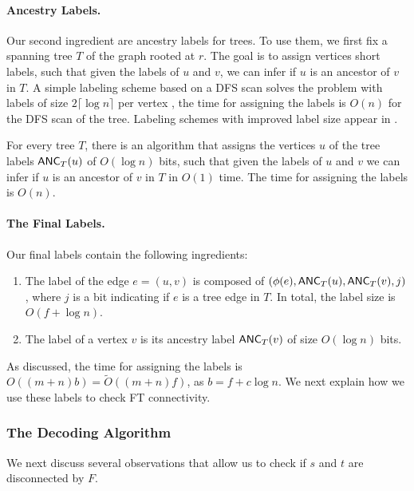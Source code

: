 \paragraph{Ancestry Labels.} Our second ingredient are ancestry labels for trees.
To use them, we first fix a spanning tree $T$ of the graph rooted at $r$. The goal is to assign vertices short labels, such that given the labels of $u$ and $v$, we can infer if $u$ is an ancestor of $v$ in $T$. A simple labeling scheme based on a DFS scan solves the problem with labels of size $2 \lceil \log{n} \rceil$ per vertex \cite{kannan1992implicat}, the time for assigning the labels is $O(n)$ for the DFS scan of the tree. Labeling schemes with improved label size appear in \cite{abiteboul2006compact,alstrup2002improved,fraigniaud2010compact,fraigniaud2010optimal}.

\begin{lemma} \label{anc_labels}
For every tree $T$, there is an algorithm that assigns the vertices $u$ of the tree labels $\mathsf{ANC}_T(u)$ of $O(\log{n})$ bits, such that given the labels of $u$ and $v$ we can infer if $u$ is an ancestor of $v$ in $T$ in $O(1)$ time. The time for assigning the labels is $O(n)$. 
\end{lemma}

\paragraph{The Final Labels.}
Our final labels contain the following ingredients:
\begin{enumerate}
\item The label of the edge $e=(u,v)$ is composed of $(\phi(e),\mathsf{ANC}_T(u),\mathsf{ANC}_T(v),j)$, where $j$ is a bit indicating if $e$ is a tree edge in $T$. In total, the label size is $O(f + \log{n})$.
\item The label of a vertex $v$ is its ancestry label $\mathsf{ANC}_T(v)$ of size $O(\log{n})$ bits.
\end{enumerate}

As discussed, the time for assigning the labels is $O((m+n)b)=\widetilde{O}((m+n)f)$, as $b=f+c\log{n}$.
We next explain how we use these labels to check FT connectivity.


\subsubsection{The Decoding Algorithm}

We next discuss several observations that allow us to check if $s$ and $t$ are disconnected by $F$.

